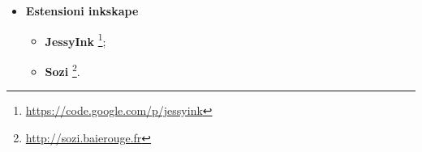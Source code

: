 \begin{itemize}
  	\begin{itemize}
  		\item \textbf{Imprys lite};
  		\item \textbf{FlowBoard}
  		\footnote{\url{https://flowvella.com}};
  		\item \textbf{Haiku Deck}
  		\footnote{\url{https://www.haikudeck.com}}.
  	\end{itemize}
  	  	\item \textbf{Estensioni inkskape}
  	\begin{itemize}
  		\item \textbf{JessyInk}
  		\footnote{\url{https://code.google.com/p/jessyink}};
  		\item \textbf{Sozi}
  		\footnote{\url{http://sozi.baierouge.fr}}.
  	\end{itemize}
\end{itemize}

